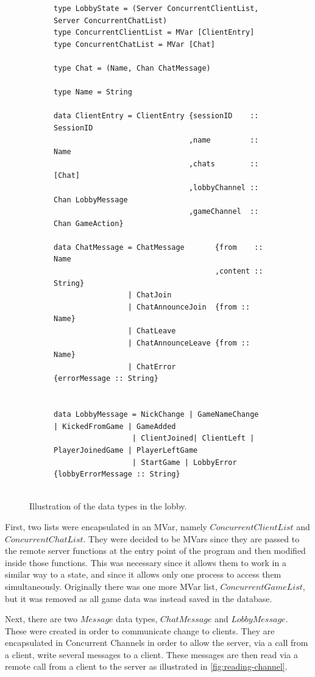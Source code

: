 \documentclass[a4paper]{article}
\begin{document}
\begin{figure}[h!]
\begin{subfigure}{\textwidth}
    \end{subfigure}
    \begin{subfigure}{\textwidth}
        \begin{lstlisting}
type LobbyState = (Server ConcurrentClientList, Server ConcurrentChatList)
type ConcurrentClientList = MVar [ClientEntry]
type ConcurrentChatList = MVar [Chat]

type Chat = (Name, Chan ChatMessage)

type Name = String

data ClientEntry = ClientEntry {sessionID    :: SessionID
                               ,name         :: Name
                               ,chats        :: [Chat]
                               ,lobbyChannel :: Chan LobbyMessage
                               ,gameChannel  :: Chan GameAction}

data ChatMessage = ChatMessage       {from    :: Name
                                     ,content :: String}
                 | ChatJoin
                 | ChatAnnounceJoin  {from :: Name}
                 | ChatLeave
                 | ChatAnnounceLeave {from :: Name}
                 | ChatError         {errorMessage :: String}


data LobbyMessage = NickChange | GameNameChange | KickedFromGame | GameAdded 
                  | ClientJoined| ClientLeft | PlayerJoinedGame | PlayerLeftGame 
                  | StartGame | LobbyError {lobbyErrorMessage :: String}


        \end{lstlisting}
    \end{subfigure}
    \caption{Illustration of the data types in the lobby.}
    \label{fig:datatypes}
\end{figure}

First, two lists were encapsulated in an MVar, namely $ConcurrentClientList$ and $ConcurrentChatList$. They were decided to be MVars since they are passed to the remote server functions at the entry point of the program and then modified inside those functions. This was necessary since it allows them to work in a similar way to a state, and since it allows only one process to access them simultaneously. Originally there was one more MVar list, $ConcurrentGameList$, but it was removed as all game data was instead saved in the database.

Next, there are two $Message$ data types, $ChatMessage$ and $LobbyMessage$. These were created in order to communicate change to clients. They are encapsulated in Concurrent Channels in order to allow the server, via a call from a client, write several messages to a client. These messages are then read via a remote call from a client to the server as illustrated in \cref{fig:reading-channel}.
\end{document}
